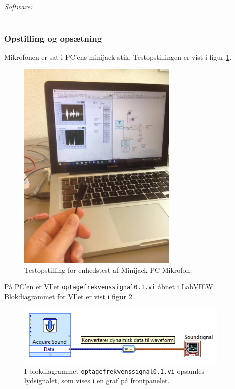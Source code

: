 			\textit{Software:}\\
			\labview\\
	
		\subsubsection{Opstilling og opsætning}
		Mikrofonen er sat i PC'ens minijack-stik. Testopstillingen er vist i figur \ref{fig:etmik}.\\ 
	  
			\begin{figure}[htb]
			\centering
				\includegraphics[width=3in]{mikopstilling}
				\caption{Testopstilling for enhedstest af Minijack PC Mikrofon.}	
				\label{fig:etmik}
			\end{figure}
	
			På PC'en er VI'et \texttt{optagefrekvenssignal0.1.vi} åbnet i LabVIEW. Blokdiagrammet for VI'et er vist i figur \ref{fig:bdoptage}.   \\   
	
			\begin{figure}[htb]
			\centering
				\includegraphics[width=4in]{optagefrekvenssignal01}
				\caption{I blokdiagrammet \texttt{optagefrekvenssignal0.1.vi} opsamles lydsignalet, som vises i en graf på frontpanelet.}	
				\label{fig:bdoptage}
			\end{figure}	  
	
